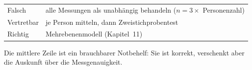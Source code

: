 \begin{aufgabe}
\begin{center}
\renewcommand{\arraystretch}{1.5}
\begin{tabular}{@{}P{2.4cm}P{6.2cm}@{}}
\toprule
\textcolor{akzent}{Falsch} & alle Messungen als unabhängig behandeln ($n = 3 \times$ Personenzahl)\\
\textcolor{mittel}{Vertretbar} & je Person mitteln, dann Zweistichprobentest\\
\textcolor{gruen}{Richtig} & Mehrebenenmodell (Kapitel~11)\\
\bottomrule
\end{tabular}
\end{center}

Die mittlere Zeile ist ein brauchbarer Notbehelf: Sie ist korrekt, verschenkt aber die Auskunft über die Messgenauigkeit.
\end{aufgabe}

